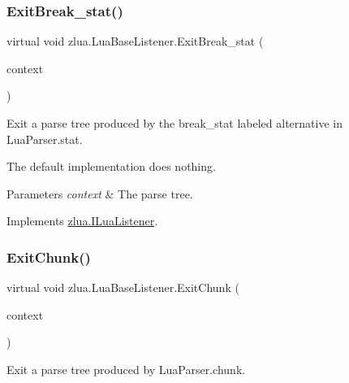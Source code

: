 \subsubsection{\texorpdfstring{Exit\+Break\+\_\+stat()}{ExitBreak\_stat()}}
{\footnotesize\ttfamily virtual void zlua.\+Lua\+Base\+Listener.\+Exit\+Break\+\_\+stat (\begin{DoxyParamCaption}\item[{\mbox{[}\+Not\+Null\mbox{]} \mbox{\hyperlink{classzlua_1_1_lua_parser_1_1_break__stat_context}{Lua\+Parser.\+Break\+\_\+stat\+Context}}}]{context }\end{DoxyParamCaption})\hspace{0.3cm}{\ttfamily [virtual]}}



Exit a parse tree produced by the {\ttfamily break\+\_\+stat} labeled alternative in Lua\+Parser.\+stat. 

The default implementation does nothing.


\begin{DoxyParams}{Parameters}
{\em context} & The parse tree.\\
\hline
\end{DoxyParams}


Implements \mbox{\hyperlink{interfacezlua_1_1_i_lua_listener_a869e5a8abc4ddac071073a74bf09b6c5}{zlua.\+I\+Lua\+Listener}}.

\mbox{\label{classzlua_1_1_lua_base_listener_aef4ea05d4f1cf0a5c223da23a2b8a312}} 
\subsubsection{\texorpdfstring{Exit\+Chunk()}{ExitChunk()}}
{\footnotesize\ttfamily virtual void zlua.\+Lua\+Base\+Listener.\+Exit\+Chunk (\begin{DoxyParamCaption}\item[{\mbox{[}\+Not\+Null\mbox{]} \mbox{\hyperlink{classzlua_1_1_lua_parser_1_1_chunk_context}{Lua\+Parser.\+Chunk\+Context}}}]{context }\end{DoxyParamCaption})\hspace{0.3cm}{\ttfamily [virtual]}}



Exit a parse tree produced by Lua\+Parser.\+chunk. 

